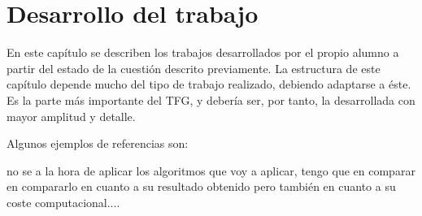 \section{Desarrollo del trabajo}  
\label{desarrollo}
En este capítulo se describen los trabajos desarrollados por el propio alumno a partir del estado de la cuestión descrito previamente. La estructura de este capítulo depende mucho del tipo de trabajo realizado, debiendo adaptarse a éste. Es la parte más importante del TFG, y debería ser, por tanto, la desarrollada con mayor amplitud y detalle.


Algunos ejemplos de referencias son:

\begin{atencion}
    no se a la hora de aplicar los algoritmos que voy a aplicar, tengo que en comparar en compararlo en cuanto a su resultado obtenido pero también en cuanto a su coste computacional....
\end{atencion}